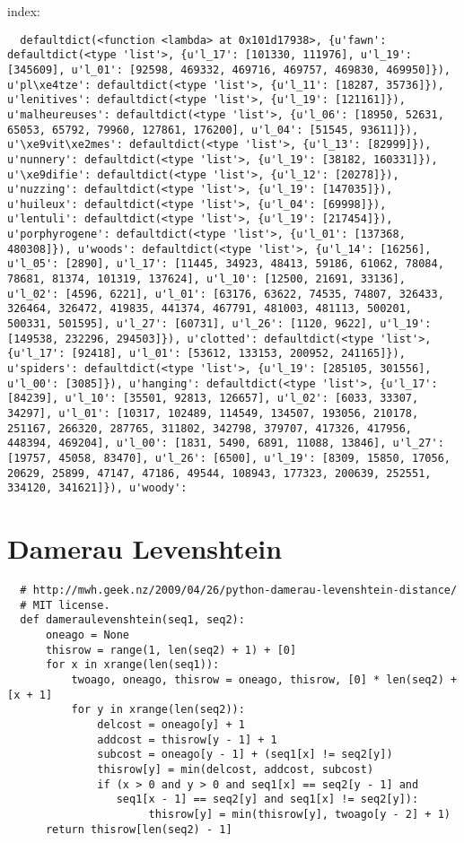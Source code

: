 index:\\
\begin{verbatim}
  defaultdict(<function <lambda> at 0x101d17938>, {u'fawn': defaultdict(<type 'list'>, {u'l_17': [101330, 111976], u'l_19': [345609], u'l_01': [92598, 469332, 469716, 469757, 469830, 469950]}), u'pl\xe4tze': defaultdict(<type 'list'>, {u'l_11': [18287, 35736]}), u'lenitives': defaultdict(<type 'list'>, {u'l_19': [121161]}), u'malheureuses': defaultdict(<type 'list'>, {u'l_06': [18950, 52631, 65053, 65792, 79960, 127861, 176200], u'l_04': [51545, 93611]}), u'\xe9vit\xe2mes': defaultdict(<type 'list'>, {u'l_13': [82999]}), u'nunnery': defaultdict(<type 'list'>, {u'l_19': [38182, 160331]}), u'\xe9difie': defaultdict(<type 'list'>, {u'l_12': [20278]}), u'nuzzing': defaultdict(<type 'list'>, {u'l_19': [147035]}), u'huileux': defaultdict(<type 'list'>, {u'l_04': [69998]}), u'lentuli': defaultdict(<type 'list'>, {u'l_19': [217454]}), u'porphyrogene': defaultdict(<type 'list'>, {u'l_01': [137368, 480308]}), u'woods': defaultdict(<type 'list'>, {u'l_14': [16256], u'l_05': [2890], u'l_17': [11445, 34923, 48413, 59186, 61062, 78084, 78681, 81374, 101319, 137624], u'l_10': [12500, 21691, 33136], u'l_02': [4596, 6221], u'l_01': [63176, 63622, 74535, 74807, 326433, 326464, 326472, 419835, 441374, 467791, 481003, 481113, 500201, 500331, 501595], u'l_27': [60731], u'l_26': [1120, 9622], u'l_19': [149538, 232296, 294503]}), u'clotted': defaultdict(<type 'list'>, {u'l_17': [92418], u'l_01': [53612, 133153, 200952, 241165]}), u'spiders': defaultdict(<type 'list'>, {u'l_19': [285105, 301556], u'l_00': [3085]}), u'hanging': defaultdict(<type 'list'>, {u'l_17': [84239], u'l_10': [35501, 92813, 126657], u'l_02': [6033, 33307, 34297], u'l_01': [10317, 102489, 114549, 134507, 193056, 210178, 251167, 266320, 287765, 311802, 342798, 379707, 417326, 417956, 448394, 469204], u'l_00': [1831, 5490, 6891, 11088, 13846], u'l_27': [19757, 45058, 83470], u'l_26': [6500], u'l_19': [8309, 15850, 17056, 20629, 25899, 47147, 47186, 49544, 108943, 177323, 200639, 252551, 334120, 341621]}), u'woody':
\end{verbatim}


\section{Damerau Levenshtein}
\label{app:damlev}

\begin{verbatim}
  # http://mwh.geek.nz/2009/04/26/python-damerau-levenshtein-distance/
  # MIT license.
  def dameraulevenshtein(seq1, seq2):
      oneago = None
      thisrow = range(1, len(seq2) + 1) + [0]
      for x in xrange(len(seq1)):
          twoago, oneago, thisrow = oneago, thisrow, [0] * len(seq2) + [x + 1]
          for y in xrange(len(seq2)):
              delcost = oneago[y] + 1
              addcost = thisrow[y - 1] + 1
              subcost = oneago[y - 1] + (seq1[x] != seq2[y])
              thisrow[y] = min(delcost, addcost, subcost)
              if (x > 0 and y > 0 and seq1[x] == seq2[y - 1] and
                 seq1[x - 1] == seq2[y] and seq1[x] != seq2[y]):
                      thisrow[y] = min(thisrow[y], twoago[y - 2] + 1)
      return thisrow[len(seq2) - 1]
\end{verbatim}


